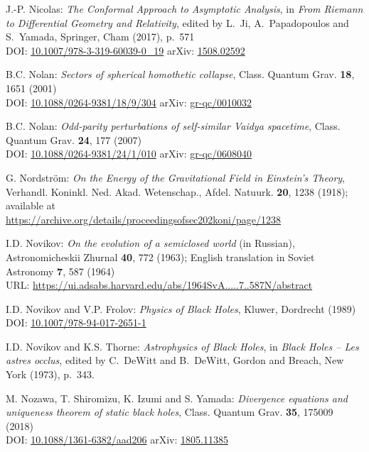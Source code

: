 \begin{thebibliography}{123}
J.-P. Nicolas:
{\em The Conformal Approach to Asymptotic Analysis},
in {\em From Riemann to Differential Geometry and Relativity},
edited by L.~Ji, A.~Papadopoulos and S.~Yamada, Springer, Cham (2017), p.~571\\
DOI: \href{https://doi.org/10.1007/978-3-319-60039-0_19}{10.1007/978-3-319-60039-0\_19}\hfill
arXiv: \href{https://arxiv.org/abs/1508.02592}{1508.02592}

B.C. Nolan:
{\em Sectors of spherical homothetic collapse},
Class. Quantum Grav. {\bf 18}, 1651 (2001)\\
DOI: \href{https://doi.org/10.1088/0264-9381/18/9/304}{10.1088/0264-9381/18/9/304}\hfill
arXiv: \href{https://arxiv.org/abs/gr-qc/0010032}{gr-qc/0010032}

B.C. Nolan:
{\em Odd-parity perturbations of self-similar Vaidya spacetime},
Class. Quantum Grav. {\bf 24}, 177 (2007)\\
DOI: \href{https://doi.org/10.1088/0264-9381/24/1/010}{10.1088/0264-9381/24/1/010}\hfill
arXiv: \href{https://arxiv.org/abs/gr-qc/0608040}{gr-qc/0608040}

G. Nordström:
{\em On the Energy of the Gravitational Field in Einstein's Theory},
Verhandl. Koninkl. Ned. Akad. Wetenschap., Afdel. Natuurk. {\bf 20}, 1238 (1918);
available at\\
\url{https://archive.org/details/proceedingsofsec202koni/page/1238}

I.D. Novikov:
{\em On the evolution of a semiclosed world} (in Russian),
Astronomicheskii Zhurnal {\bf 40}, 772 (1963); English translation in
Soviet Astronomy {\bf 7}, 587 (1964)\\
URL: \url{https://ui.adsabs.harvard.edu/abs/1964SvA.....7..587N/abstract}

I.D. Novikov and V.P. Frolov: {\em Physics of Black Holes},
Kluwer, Dordrecht (1989)\\
DOI: \href{https://doi.org/10.1007/978-94-017-2651-1}{10.1007/978-94-017-2651-1}

I.D. Novikov and K.S. Thorne: {\em Astrophysics of Black Holes},
in {\em Black Holes -- Les astres occlus},  edited by C.~DeWitt and B.~DeWitt,
Gordon and Breach, New York (1973), p.~343.

M. Nozawa, T. Shiromizu, K. Izumi and S. Yamada:
{\em Divergence equations and uniqueness theorem of static black holes},
Class. Quantum Grav. {\bf 35}, 175009 (2018)\\
DOI: \href{https://doi.org/10.1088/1361-6382/aad206}{10.1088/1361-6382/aad206}\hfill
arXiv: \href{https://arxiv.org/abs/1805.11385}{1805.11385}


\end{thebibliography}
